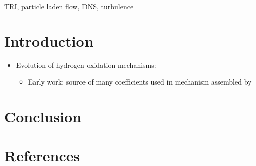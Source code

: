 \documentclass[review,1p,times]{elsarticle} %
\begin{document}
\begin{frontmatter}




\title{}
\author{}



\begin{abstract}
  
\end{abstract}

\begin{keyword}
  TRI, particle laden flow, DNS, turbulence
\end{keyword}

\end{frontmatter}

\begin{abstract}
\end{abstract}
\vspace{.1in}


\section{Introduction}

\begin{itemize}
    \item Evolution of hydrogen oxidation mechanisms:
        \begin{itemize}
            \item Early work: \citet{TsangH86} source of many coefficients used in mechanism assembled by \citet{MuellerKYD99}
        \end{itemize}

\end{itemize}


\section{Conclusion}


\section{References}
    

\end{document}
